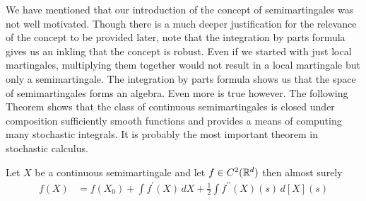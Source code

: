 We have mentioned that our introduction of the concept of semimartingales was not well motivated.  Though there is a much deeper justification for the relevance of the concept to be provided later, note that the integration by parts formula gives us an inkling that the concept is robust.  Even if we started with just local martingales, multiplying them together would not result in a local martingale but only a semimartingale.  The integration by parts formula shows us that the space of semimartingales forms an algebra.  Even more is true however.
The following Theorem shows that the class of continuous semimartingales is closed under composition sufficiently smooth functions and provides a means of computing many stochastic integrals.  It is probably the most important theorem in stochastic calculus.
\begin{thm}\label{ItoLemmaContinuousSemimartingale}Let $X$ be a continuous semimartingale and let $f \in C^2(\mathbb{R}^d)$ then almost surely
\begin{align*}
f(X) &= f(X_0) + \int f^\prime(X) \, dX + \frac{1}{2} \int f^{\prime \prime}(X) (s) \, d[X](s)
\end{align*}
\end{thm}
